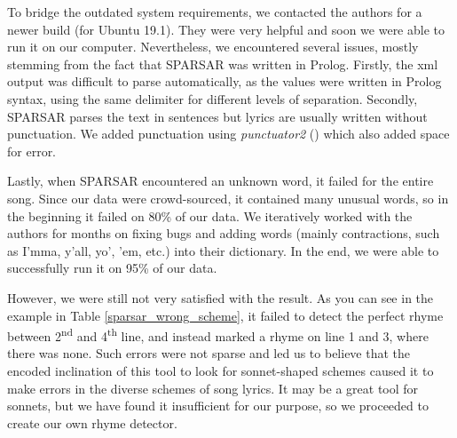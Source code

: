 To bridge the outdated system requirements, we contacted the authors for a newer build (for Ubuntu 19.1). They were very helpful and soon we were able to run it on our computer. Nevertheless, we encountered several issues, mostly stemming from the fact that SPARSAR was written in Prolog. Firstly, the xml output was difficult to parse automatically, as the values were written in Prolog syntax, using the same delimiter for different levels of separation. Secondly, SPARSAR parses the text in sentences but lyrics are usually written without punctuation. We added punctuation using \textit{punctuator2} (\cite{tilk2016punctuation}) which also added space for error. 

Lastly, when SPARSAR encountered an unknown word, it failed for the entire song. Since our data were crowd-sourced, it contained many unusual words, so in the beginning it failed on 80\% of our data. We iteratively worked with the authors for months on fixing bugs and adding words (mainly contractions, such as I'mma, y'all, yo', 'em, etc.) into their dictionary. In the end, we were able to successfully run it on 95\% of our data.

However, we were still not very satisfied with the result. As you can see in the example in Table \ref{sparsar_wrong_scheme}, it failed to detect the perfect rhyme between 2\textsuperscript{nd} and 4\textsuperscript{th} line, and instead marked a rhyme on line 1 and 3, where there was none. Such errors were not sparse and led us to believe\deleted{,} that the encoded inclination of this tool to look for sonnet-shaped schemes caused it to make errors in the diverse schemes of song lyrics. It may be a great tool for sonnets, but we have found it insufficient for our purpose, so we proceeded to create our own rhyme detector.




